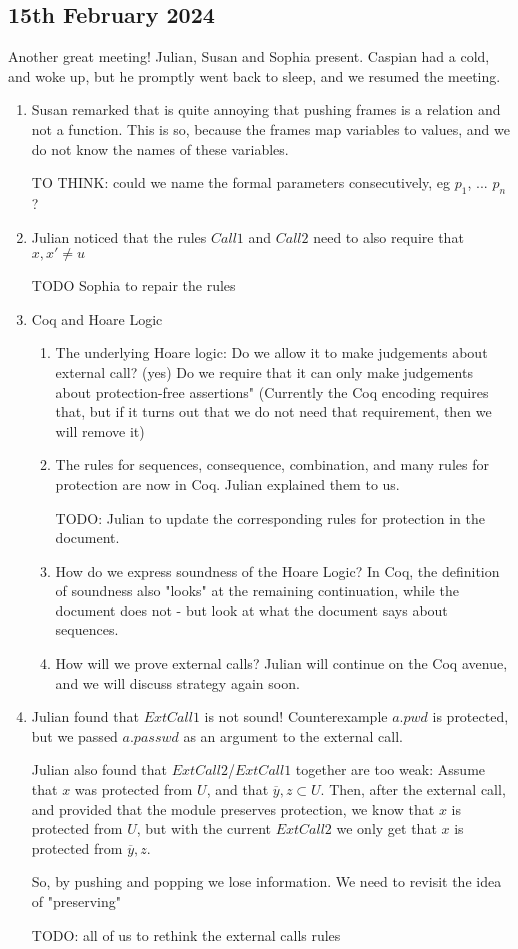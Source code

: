 \documentclass[acmsmall,review,anonymous]{acmart}\settopmatter{printfolios=true}
\begin{document}
\subsection* {15th February 2024}

Another great meeting! Julian, Susan and Sophia present. Caspian had a cold, and woke up, but he promptly went back to sleep, and we resumed the meeting.

\begin{enumerate}
\item
Susan remarked that is quite annoying that pushing frames is a relation and not a function. This is so, because the frames map variables to values, and we do not know the names of these variables. 

TO THINK: could we name the formal parameters consecutively, eg $p_1$, ... $p_n$?
\item
Julian noticed that the rules $Call1$ and $Call2$ need to also require that $x,x' \neq u$

TODO Sophia to repair the rules
\item
Coq and  Hoare Logic
\begin{enumerate}
\item
The underlying Hoare logic: Do we allow it to make judgements about external call? (yes) Do we require that it can only make judgements about protection-free assertions" (Currently the Coq encoding requires that, but if it turns out that we do not need that requirement, then we will remove it)
\item 
The rules for sequences, consequence, combination, and many rules for protection are now in Coq. Julian explained them to us. 

TODO: Julian to update the corresponding rules for protection in the document.
\item
How do we express soundness of the Hoare Logic? In Coq, the definition of soundness also "looks"  at the remaining continuation, while the document does not - but look at what the document says about sequences.
\item
How will we prove external calls? Julian will continue on the Coq avenue, and we will discuss strategy again soon. 
\end{enumerate}
\item
Julian found that $ExtCall1$ is not sound! Counterexample $a.pwd$ is protected, but we passed $a.passwd$ as an argument to the external call. 

Julian also found that $ExtCall2$/$ExtCall1$ together are too weak: Assume that $x$ was protected from $U$, and that $\overline y, z \subset U$. Then, after the external call, and provided that the module preserves protection, we know that  $x$ is protected from $U$, but with the current $ExtCall2$ we only get that $x$ is protected from $\overline y,z$. 

So, by pushing and popping we lose information. We need to revisit the idea of "preserving"

TODO: all of us to rethink the external calls rules
\end{enumerate}
\end{document}
